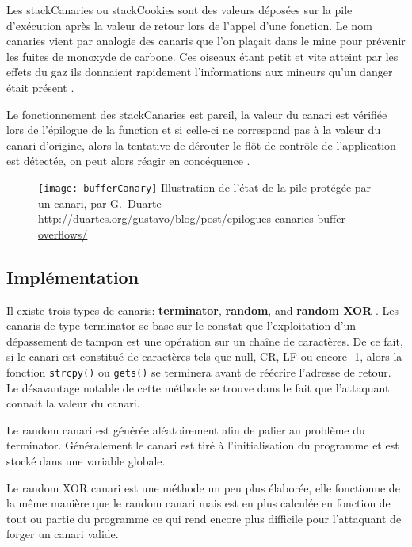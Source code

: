 Les \gls{stackCanaries} ou \gls{stackCookies} sont des valeurs déposées sur la pile d'exécution après la valeur de retour lors de l'appel d'une fonction. Le nom \og canaries \fg vient par analogie des canaris que l'on plaçait dans le mine pour prévenir les fuites de monoxyde de carbone. Ces oiseaux étant petit et vite atteint par les effets du gaz ils donnaient rapidement l'informations aux mineurs qu'un danger était présent \cite{StackCanaries} \cite{SentinelSpecies}.

Le fonctionnement des \gls{stackCanaries} est pareil, la valeur du canari est vérifiée lors de l'épilogue de la function et si celle-ci ne correspond pas à la valeur du canari d'origine, alors la tentative de dérouter le flôt de contrôle de l'application est détectée, on peut alors réagir en concéquence \cite{EpiloguesCanariesBufferOverflows}.

\begin{figure}[H]
	\centering
	\texttt{[image: bufferCanary]}
	{Illustration de l'état de la pile protégée par un canari, par G.~Duarte}
	{\url{http://duartes.org/gustavo/blog/post/epilogues-canaries-buffer-overflows/}}
	\label{fig:bufferCanary}
\end{figure}

\subsection{Implémentation}

Il existe trois types de canaris: \textbf{terminator}, \textbf{random}, and \textbf{random XOR} \cite{BufferOverflowProtection}. Les canaris de type terminator se base sur le constat que l'exploitation d'un dépassement de tampon est une opération sur un chaîne de caractères. De ce fait, si le canari est constitué de caractères tels que null, CR, LF ou encore -1, alors la fonction \texttt{strcpy()} ou \texttt{gets()} se terminera avant de réécrire l'adresse de retour. Le désavantage notable de cette méthode se trouve dans le fait que l'attaquant connait la valeur du canari.

Le random canari est générée aléatoirement afin de palier au problème du terminator. Généralement le canari est tiré à l'initialisation du programme et est stocké dans une variable globale.

Le random XOR canari est une méthode un peu plus élaborée, elle fonctionne de la même manière que le random canari mais est en plus calculée en fonction de tout ou partie du programme ce qui rend encore plus difficile pour l'attaquant de forger un canari valide.

